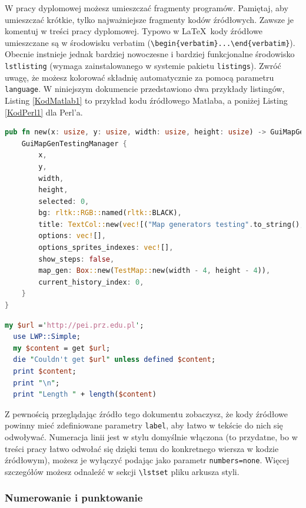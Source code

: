 \documentclass[12pt,twoside]{article}
\begin{document}
W pracy dyplomowej możesz umieszczać fragmenty programów. Pamiętaj, aby umieszczać krótkie, tylko najważniejsze fragmenty kodów źródłowych. Zawsze je komentuj w treści
pracy dyplomowej. Typowo w \LaTeX\ kody źródłowe umieszczane są w środowisku verbatim (\verb|\begin{verbatim}...\end{verbatim}|). Obecnie instnieje jednak bardziej nowoczesne i bardziej funkcjonalne środowisko \verb|lstlisting| (wymaga zainstalowanego w systemie pakietu \verb|listings|). Zwróć uwagę, że możesz kolorować składnię
automatycznie za pomocą parametru \verb|language|. W niniejszym dokumencie przedstawiono dwa przykłady listingów, Listing \ref{KodMatlab1} to przykład kodu źródłowego Matlaba, a poniżej Listing \ref{KodPerl1} dla Perl'a.\\


\begin{lstlisting}[language=Rust,caption=Listing programu Matlab,label={KodMatlab1}]
pub fn new(x: usize, y: usize, width: usize, height: usize) -> GuiMapGenTestingManager {
	GuiMapGenTestingManager {
		x,
		y,
		width,
		height,
		selected: 0,
		bg: rltk::RGB::named(rltk::BLACK),
		title: TextCol::new(vec![("Map generators testing".to_string(),rltk::RGB::named(rltk::WHITE))]),
		options: vec![],
		options_sprites_indexes: vec![],
		show_steps: false,
		map_gen: Box::new(TestMap::new(width - 4, height - 4)),
		current_history_index: 0,
	}
}
\end{lstlisting}

\begin{lstlisting}[language=Perl,caption=Listing programu Perl,label={KodPerl1}]
  my $url ='http://pei.prz.edu.pl';
  use LWP::Simple;
  my $content = get $url;
  die "Couldn't get $url" unless defined $content;
  print $content;
  print "\n";
  print "Length " + length($content)
\end{lstlisting}

Z pewnością przeglądając źródło tego dokumentu zobaczysz, że kody źródłowe powinny mieć zdefiniowane parametry \verb|label|, aby łatwo w tekście do nich się odwoływać.
Numeracja linii jest w stylu domyślnie włączona (to przydatne, bo w treści pracy łatwo odwołać się dzięki temu do konkretnego wiersza w kodzie źródłowym), możesz je wyłączyć podając jako parametr \verb|numbers=none|. Więcej szczegółów możesz odnaleźć w sekcji \verb|\lstset| pliku arkusza styli. 


\subsubsection{Numerowanie i punktowanie}
\end{document}
